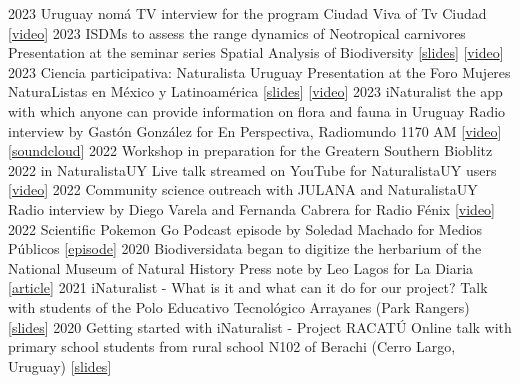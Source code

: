 \documentclass[9pt]{developercv} %
\begin{document}
\begin{entrylist}
	\entrylong
		{2023}
		{Uruguay nomá}
		{}
		{TV interview for the program Ciudad Viva of Tv Ciudad [\href{https://youtu.be/Edfpt810rt0}{video}]}
	\entrylong
		{2023}
		{ISDMs to assess the range dynamics of Neotropical carnivores}
		{}
		{Presentation at the seminar series Spatial Analysis of Biodiversity [\href{https://flograttarola.com/Modelado_de_NE_y_DG.pdf}{slides}] [\href{https://www.youtube.com/live/F0BpYC3iE4g}{video}]}
	\entrylong
		{2023}
		{Ciencia participativa: Naturalista Uruguay}
		{}
		{Presentation at the Foro Mujeres NaturaListas en México y Latinoamérica [\href{https://flograttarola.com/talk/ciencia-participativa-y-naturalista-uruguay/Foro_mujeres_Mexico_y_Latam.pdf}{slides}] [\href{https://fb.watch/iBdjBHYFQm/}{video}]}
	\entrylong
		{2023}
		{iNaturalist the app with which anyone can provide information on flora and fauna in Uruguay}
		{}
		{Radio interview by Gastón González for En Perspectiva, Radiomundo 1170 AM [\href{https://youtu.be/TcYk9ZquyvE}{video}] [\href{https://soundcloud.com/en-perspectiva-uy/entrevista-florencia-grattarola-naturalistauy-te-invita-a-realizar-ciencia-ciudadana}{soundcloud}]}
	\entrylong
		{2022}
		{Workshop in preparation for the Greatern Southern Bioblitz 2022 in NaturalistaUY}
		{}
		{Live talk streamed on YouTube for NaturalistaUY users [\href{https://youtu.be/sPKhUy3CJQ0}{video}]}
	\entrylong
		{2022}
		{Community science outreach with JULANA and NaturalistaUY}
		{}
		{Radio interview by Diego Varela and Fernanda Cabrera for Radio Fénix [\href{https://youtu.be/Scc01vg1PTs}{video}]}
	\entrylong
		{2022}
		{Scientific Pokemon Go}
		{}
		{Podcast episode by Soledad Machado for Medios Públicos [\href{https://open.spotify.com/episode/05X1u40HyvvTjuuYKjyJE2?si=jCNZ8hHmQ8S-CSfiNOCryQ}{episode}]}
	\entrylong
		{2020}
		{Biodiversidata began to digitize the herbarium of the National Museum of Natural History}
		{}
		{Press note by Leo Lagos for La Diaria [\href{https://ladiaria.com.uy/ciencia/articulo/2020/2/biodiversidata-comenzo-a-digitalizar-el-herbario-del-museo-nacional-de-historia-natural/}{article}]}
	\entrylong
		{2021}
		{iNaturalist - What is it and what can it do for our project?}
		{}
		{Talk with students of the Polo Educativo Tecnológico Arrayanes (Park Rangers) [\href{https://flograttarola.com/pdf/Arrayanes_iNatUY.pdf}{slides}]}
	\entrylong
		{2020}
		{Getting started with iNaturalist - Project RACATÚ}
		{}
		{Online talk with primary school students from rural school N102 of Berachi (Cerro Largo, Uruguay) [\href{https://flograttarola.com/pdf/iNat_Berachi.pdf}{slides}]}

\end{entrylist}
\end{document}
